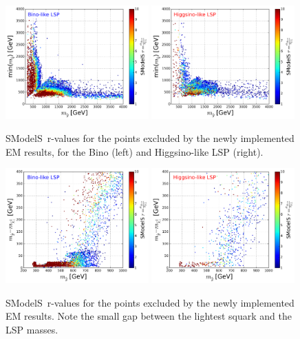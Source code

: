 \documentclass[a4paper,11pt]{article}
\newcommand{\SMO}{{\sc SModelS}}
\begin{document}
\begin{figure}[!]
\begin{center}
\subfigure
\includegraphics[width=0.49\textwidth]{PLOTS/BINO_rValus_Glu_Sq.png}
\subfigure
{\includegraphics[width=0.49\textwidth]{PLOTS/HIGGSINO_rValus_Glu_Sq.png}}
\end{center}
\caption{\SMO~r-values for the points excluded by the newly implemented EM results, for the Bino (left) and Higgsino-like LSP (right).} 
\label{rValues}
\end{figure}
%
%
\begin{figure}[!]
\begin{center}
\subfigure
\includegraphics[width=0.49\textwidth]{PLOTS/BINO_rValus_Glu_Diff_Neu.png}
\subfigure
{\includegraphics[width=0.49\textwidth]{PLOTS/HIGGSINO_rValus_Glu_Diff_Neu.png}}
\end{center}
\caption{\SMO~r-values for the points excluded by the newly implemented EM results. Note the small gap between the lightest squark and the LSP masses. } 
\label{rValues_diff}
\end{figure}
%
\end{document}
